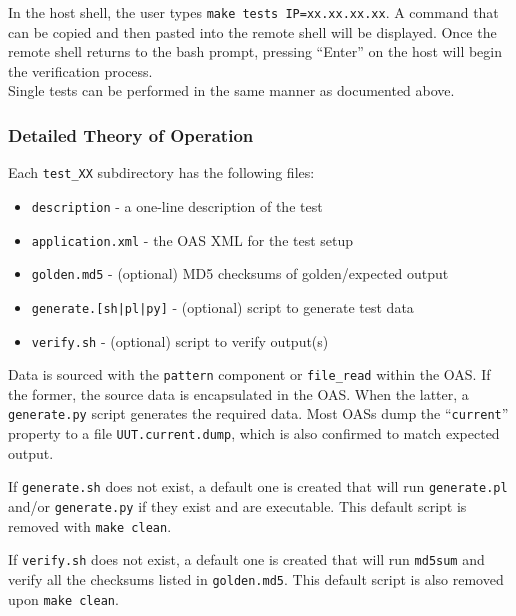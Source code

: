 \documentclass{article}
\begin{document}
In the host shell, the user types \verb+make tests IP=xx.xx.xx.xx+. A command that can be copied and then pasted into the remote shell will be displayed. Once the remote shell returns to the bash prompt, pressing ``Enter'' on the host will begin the verification process. \\

Single tests can be performed in the same manner as documented above.

\subsubsection*{Detailed Theory of Operation}
\begin{flushleft}
  Each \verb+test_XX+ subdirectory has the following files:

  \begin{itemize}{}{}
    \item \texttt{description} - a one-line description of the test
    \item \texttt{application.xml} - the OAS XML for the test setup
    \item \texttt{golden.md5} - (optional) MD5 checksums of golden/expected output
    \item \texttt{generate.[sh|pl|py]} - (optional) script to generate test data
    \item \texttt{verify.sh} - (optional) script to verify output(s)
  \end{itemize}

	Data is sourced with the \verb+pattern+ component or \verb+file_read+ within the OAS. If the former, the source data is encapsulated in the OAS. When the latter, a \verb+generate.py+ script generates the required data. Most OASs dump the ``\texttt{current}'' property to a file \verb+UUT.current.dump+, which is also confirmed to match expected output.
  \medskip

  If \texttt{generate.sh} does not exist, a default one is created that will run \texttt{generate.pl} and/or \texttt{generate.py} if they exist and are executable. This default script is removed with \verb+make clean+.
  \medskip

	If \texttt{verify.sh} does not exist, a default one is created that will run \texttt{md5sum} and verify all the checksums listed in \texttt{golden.md5}. This default script is also removed upon \verb+make clean+.
  \medskip
\end{flushleft}
\end{document}
